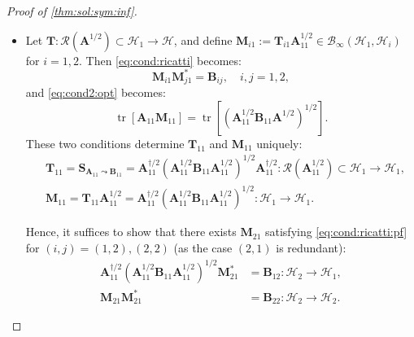 \documentclass[noinfoline]{imsart}\setcounter{tocdepth}{2}
\newcommand{\m}[1]{\mathbf{#1}} %
\renewcommand{\c}[1]{\mathcal{#1}} %
\DeclareMathOperator*{\tr}{tr}
\theoremstyle{plain}
\begin{document}
\begin{proof}[Proof of \cref{thm:sol:sym:inf}]
\begin{itemize}[leftmargin = *]
\item [($\Leftarrow$)] 
Let $\m{T}: \c{R}(\m{A}^{1/2}) \subset \c{H}_{1} \rightarrow \c{H}$, and define $\m{M}_{i1} := \m{T}_{i1} \m{A}_{11}^{1/2} \in \c{B}_{\infty}(\c{H}_{1}, \c{H}_{i})$ for $i=1, 2$. Then \eqref{eq:cond:ricatti} becomes: 
\begin{equation}\label{eq:cond:ricatti:pf}
    \m{M}_{i1} \m{M}_{j1}^{*} = \m{B}_{ij}, \quad i, j = 1, 2,
\end{equation}
and \eqref{eq:cond2:opt} becomes:
\begin{equation*}
    \tr[ \m{A}_{11} \m{M}_{11}] = \tr [(\m{A}_{11}^{1/2} \m{B}_{11} \m{A}^{1/2})^{1/2}].
\end{equation*}
These two conditions determine $\m{T}_{11}$ and $\m{M}_{11}$ uniquely:
\begin{align*}
    &\m{T}_{11} = \m{S}_{\m{A}_{11} \leadsto \m{B}_{11}} = \m{A}_{11}^{\dagger/2} (\m{A}_{11}^{1/2} \m{B}_{11} \m{A}_{11}^{1/2})^{1/2} \m{A}_{11}^{\dagger/2}: \c{R}(\m{A}_{11}^{1/2}) \subset \c{H}_{1} \rightarrow \c{H}_{1}, \\
    &\m{M}_{11} = \m{T}_{11} \m{A}_{11}^{1/2} = \m{A}_{11}^{\dagger/2} (\m{A}_{11}^{1/2} \m{B}_{11} \m{A}_{11}^{1/2})^{1/2} : \c{H}_{1} \rightarrow \c{H}_{1}.
\end{align*}

Hence, it suffices to show that there exists $\m{M}_{21}$ satisfying \eqref{eq:cond:ricatti:pf} for $(i, j) =(1, 2), (2, 2)$ (as the case $(2, 1)$ is redundant):
\begin{align}
    \m{A}_{11}^{\dagger/2} (\m{A}_{11}^{1/2} \m{B}_{11} \m{A}_{11}^{1/2})^{1/2} \m{M}_{21}^{*} &= \m{B}_{12}: \c{H}_{2} \rightarrow \c{H}_{1}, \label{eq:cond:ricatti:pf1} \\
    \m{M}_{21} \m{M}_{21}^{*} &= \m{B}_{22}: \c{H}_{2} \rightarrow \c{H}_{2}. \label{eq:cond:ricatti:pf2}
\end{align}


\end{itemize}
\end{proof}
\end{document}
